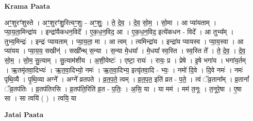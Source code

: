 \documentclass[17pt]{extarticle}
\begin{document}
\textbf{Krama Paata} \newline

अꣳ॒॒शुरꣳ॑शुस्ते । अꣳ॒॒शुरꣳ॑शु॒रित्यꣳ॒॒शुः - अꣳ॒॒शुः॒ । ते॒ दे॒व॒ । दे॒व॒ सो॒म॒ । सो॒मा । आ प्या॑यताम् । प्या॒य॒ता॒मिन्द्रा॑य । इन्द्रा॑यैकधन॒विदे᳚ । ए॒क॒ध॒न॒विद॒ आ । ए॒क॒ध॒न॒विद॒ इत्ये॑कधन - विदे᳚ । आ तुभ्य᳚म् । तुभ्य॒मिन्द्रः॑ । इन्द्रः॑ प्यायताम् । प्या॒य॒ता॒ मा । आ त्वम् । त्वमिन्द्रा॑य । इन्द्रा॑य प्यायस्व । प्या॒य॒स्वा । आ प्या॑यय । प्या॒य॒य॒ सखीन्॑ । सखी᳚न्थ् स॒न्या । स॒न्या मे॒धया᳚ । मे॒धया᳚ स्व॒स्ति । स्व॒स्ति ते᳚ । ते॒ दे॒व॒ । दे॒व॒ सो॒म॒ । सो॒म॒ सु॒त्याम् । सु॒त्याम॑शीय । अ॒शी॒येष्टः॑ । एष्टा॒ रायः॑ । रायः॒ प्र । प्रेषे । इ॒षे भगा॑य । भगा॑य॒र्तम् । ऋ॒तमृ॑तवा॒दिभ्यः॑ । ऋ॒त॒वा॒दिभ्यो॒ नमः॑ । ऋ॒त॒वा॒दिभ्य॒ इत्यृ॑तवा॒दि - भ्यः॒ । नमो॑ दि॒वे । दि॒वे नमः॑ । नमः॑ पृथि॒व्यै । पृ॒थि॒व्या अग्ने᳚ । अग्ने᳚ व्रतपते । व्र॒त॒प॒ते॒ त्वम् । व्र॒त॒प॒त॒ इति॑ व्रत - प॒ते॒ । त्वं ॅव्र॒ताना᳚म् । व्र॒तानां᳚ ॅव्र॒तप॑तिः । व्र॒तप॑तिरसि । व्र॒तप॑ति॒रिति॑ व्र॒त - प॒तिः॒ । अ॒सि॒ या । या मम॑ । मम॑ त॒नूः । त॒नूरे॒षा । ए॒षा सा । सा त्वयि॑ ( ) । त्वयि॒ या \newline

\textbf{Jatai Paata} \newline
\end{document}
